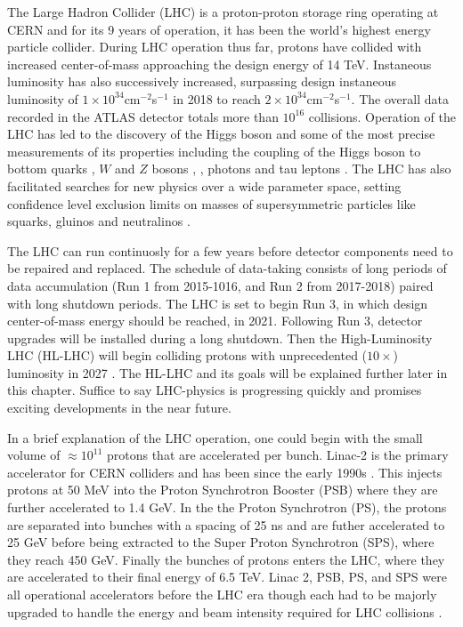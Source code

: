  
The Large Hadron Collider (LHC) is a proton-proton storage ring operating at CERN and for its 9 years of operation, it has been the world's highest energy particle collider. 
During LHC operation thus far, protons have collided with increased center-of-mass approaching the design energy of 14 TeV. Instaneous luminosity has also successively increased, surpassing design instaneous luminosity of $1\times10^{34}$cm$^{-2}$s$^{-1}$ in 2018 to reach $2\times10^{34}$cm$^{-2}$s$^{-1}$\cite{CERNnews1}. The overall data recorded in the ATLAS detector totals more than $10^{16}$ collisions. Operation of the LHC has led to the discovery of the Higgs boson and some of the most precise measurements of its properties including the coupling of the Higgs boson to bottom quarks \cite{Aaboud_2018_0}, $W$ and $Z$ bosons \cite{Aaboud_2019}, \cite{Aaboud_2018}, photons\cite{Aaboud_2018_2} and tau leptons \cite{Aaboud_2019_2}. The LHC has also facilitated searches for new physics over a wide parameter space, setting confidence level exclusion limits on masses of supersymmetric particles like squarks, gluinos and neutralinos \cite{ATLAS-CONF-2019-040}. 

The LHC can run continuosly for a few years before detector components need to be repaired and replaced. The schedule of data-taking consists of long periods of data accumulation (Run 1 from 2015-1016, and Run 2 from 2017-2018) paired with long shutdown periods. The LHC is set to begin Run 3, in which design center-of-mass energy should be reached, in 2021. Following Run 3, detector upgrades will be installed during a long shutdown. Then the High-Luminosity LHC (HL-LHC) will begin colliding protons with unprecedented ($10\times$) luminosity in 2027 \cite{CERNnews2}. The HL-LHC and its goals will be explained further later in this chapter. Suffice to say LHC-physics is progressing quickly and promises exciting developments in the near future. 

In a brief explanation of the LHC operation, one could begin with the small volume of $\approx 10^{11}$ protons that are accelerated per bunch. Linac-2 is the primary accelerator for CERN colliders and has been since the early 1990s \cite{LHCInjector}. This injects protons at 50 MeV into the Proton Synchrotron Booster (PSB) where they are further accelerated to 1.4 GeV. In the the Proton Synchrotron (PS), the protons are separated into bunches with a spacing of 25 ns and are futher accelerated to 25 GeV before being extracted to the Super Proton Synchrotron (SPS), where they reach 450 GeV. Finally the bunches of protons enters the LHC, where they are accelerated to their final energy of 6.5 TeV. Linac 2, PSB, PS, and SPS were all operational accelerators before the LHC era though each had to be majorly upgraded to handle the energy and beam intensity required for LHC collisions \cite{LHCInjector}. 

